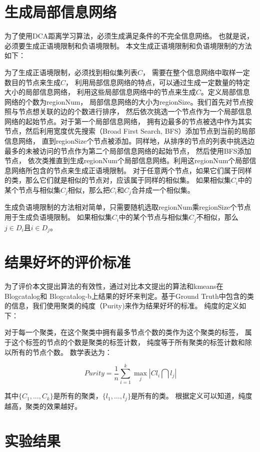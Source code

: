 \section{生成局部信息网络}

为了使用DCA距离学习算法，必须生成满足条件的不完全信息网络。
也就是说，必须要生成正语境限制和负语境限制。
本文生成正语境限制和负语境限制的方法如下：

为了生成正语境限制，必须找到相似集列表$C$，
需要在整个信息网络中取样一定数目的节点来生成$C$，
利用局部信息网络的特点，可以通过生成一定数量的特定大小的局部信息网络，
利用这些局部信息网络中的节点来生成$C$。定义局部信息网络的个数为regionNum，
局部信息网络的大小为regionSize。我们首先对节点按照与节点想关联的边的个数进行排序，
然后依次挑选一个节点作为一个局部信息网络的起始节点。对于第一个局部信息网络，
拥有边最多的节点被选中作为其实节点，然后利用宽度优先搜索（Broad First Search, BFS）添加节点到当前的局部信息网络，
直到regionSize个节点被添加。同样地，从排序的节点的列表中挑选边最多的未被访问的节点作为第二个局部信息网络的起始节点，
然后使用BFS添加节点，
依次类推直到生成regionNum个局部信息网络。利用这regionNum个局部信息网络所包含的节点来生成正语境限制。
对于任意两个节点，如果它们属于同样的类，那么它们就是相似的节点对，应该属于同样的相似集。
如果相似集$C_i$中的某个节点与相似集$C_j$相似，那么把$C_i$和$C_j$合并成一个相似集。

生成负语境限制的方法相对简单，只需要随机选取regionNum乘regionSize个节点用于生成负语境限制。
如果相似集$C_i$中的某个节点与相似集$C_j$不相似，那么$j \in D_i$且$i \in D_j$。

\section{结果好坏的评价标准}

为了评价本文提出算法的有效性，通过对比本文提出的算法和kmeans在Blogcatalog和
Blogcatalog-b上结果的好坏来判定。基于Ground Truth中包含的类的信息，我们使用聚类的纯度（Purity)来作为结果好坏的标准。
纯度的定义如下：

对于每一个聚类，在这个聚类中拥有最多节点个数的类作为这个聚类的标签，
属于这个标签的节点的个数是聚类的标签计数，
纯度等于所有聚类的标签计数和除以所有的节点个数。
数学表达为：

$$
Purity = \frac{1}{n} \sum_{i=1}^k \operatorname{max}_j |Cl_i \bigcap l_j|
$$

其中$\{C_1, ..., C_k\}$是所有的聚类，$\{l_1, ..., l_j\}$是所有的类。
根据定义可以知道，纯度越高，聚类的效果越好。


\section{实验结果}
\label{sec:results}

